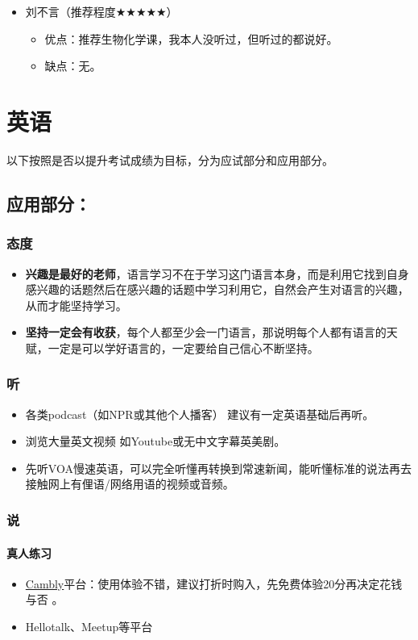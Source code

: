 \documentclass[zihao=-4,fontset=none]{Beautybook-CN}
\begin{document}
\begin{itemize}
	\item 刘不言（推荐程度${\bigstar}$${\bigstar}$${\bigstar}$${\bigstar}$${\bigstar}$）
	      \begin{itemize}
	      	\item 优点：推荐生物化学课，我本人没听过，但听过的都说好。
	      	\item 缺点：无。
	      \end{itemize}
\end{itemize}
\chapter{英语}
以下按照是否以提升考试成绩为目标，分为应试部分和应用部分。
\section{应用部分：}
\subsection{态度}
\begin{itemize}
\item \textbf{兴趣是最好的老师}，语言学习不在于学习这门语言本身，而是利用它找到自身感兴趣的话题然后在感兴趣的话题中学习利用它，自然会产生对语言的兴趣，从而才能坚持学习。
\item \textbf{坚持一定会有收获}，每个人都至少会一门语言，那说明每个人都有语言的天赋，一定是可以学好语言的，一定要给自己信心不断坚持。
\end{itemize}
\subsection{听}
\begin{itemize}
\item 各类podcast（如NPR或其他个人播客） 建议有一定英语基础后再听。
\item 浏览大量英文视频 如Youtube或无中文字幕英美剧。
\item 先听VOA慢速英语，可以完全听懂再转换到常速新闻，能听懂标准的说法再去接触网上有俚语/网络用语的视频或音频。
\end{itemize}
\subsection{说}
\subsubsection{真人练习}
\begin{itemize}
\item \href{https://www.cambly.com/english?lang=zh_CN}{Cambly}平台：使用体验不错，建议打折时购入，先免费体验20分再决定花钱与否 。
\item Hellotalk、Meetup等平台
\end{itemize}
\end{document}
